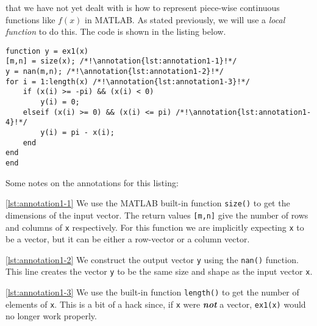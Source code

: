 that we have not yet dealt with is how to represent piece-wise continuous functions like $f(x)$ in MATLAB.  As stated previously, we will use a \emph{local function} to do this.  The code is shown in the listing below.

\begin{lstlisting}[name=lec17-ex1,style=myMatlab]
%% Local functions 
function y = ex1(x) 
[m,n] = size(x); /*!\annotation{lst:annotation1-1}!*/
y = nan(m,n); /*!\annotation{lst:annotation1-2}!*/
for i = 1:length(x) /*!\annotation{lst:annotation1-3}!*/
    if (x(i) >= -pi) && (x(i) < 0) 
        y(i) = 0;
    elseif (x(i) >= 0) && (x(i) <= pi) /*!\annotation{lst:annotation1-4}!*/
        y(i) = pi - x(i);
    end
end
end
\end{lstlisting} \setcounter{lstannotation}{0}
Some notes on the annotations for this listing:

\vspace{0.25cm}

\noindent \ref{lst:annotation1-1}  We use the MATLAB built-in function \lstinline[style=myMatlab]{size()} to get the dimensions of the input vector.  The return values \lstinline{[m,n]} give the number of rows and columns of \lstinline{x} respectively. For this function we are implicitly expecting \lstinline{x} to be a vector, but it can be either a row-vector or a column vector.

\vspace{0.25cm}

\noindent \ref{lst:annotation1-2} We construct the output vector \lstinline{y} using the \lstinline{nan()} function.  This line creates the vector \lstinline{y} to be the same size and shape as the input vector \lstinline{x}.  


\vspace{0.25cm}

\noindent \ref{lst:annotation1-3} We use the built-in function \lstinline[style=myMatlab]{length()} to get the number of elements of \lstinline{x}.  This is a bit of a hack since, if \lstinline{x} were \textbf{\emph{not}} a vector, \lstinline{ex1(x)} would no longer work properly.

